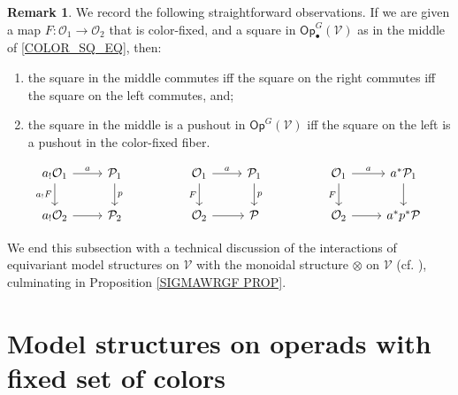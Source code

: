\documentclass[a4paper,10pt
,draft
]{article}%
\numberwithin{equation}{section}
\numberwithin{figure}{section}
\theoremstyle{definition} %
\newtheorem{remark}[equation]{Remark}%
\newcommand{\Op}{\mathsf{Op}}%
\newcommand{\V}{\ensuremath{\mathcal V}}
\renewcommand{\O}{\ensuremath{\mathcal O}}
\renewcommand{\P}{\ensuremath{\mathcal P}}
\newcommand{\1}{\ensuremath{\mathbbm 1}}%
\begin{document}
\begin{remark}\label{COLOR_SQ_REM}
      We record the following straightforward observations.
      If we are given a map $F: \O_1 \to \O_2$ that is color-fixed,
      and a square in $\Op^G_\bullet(\V)$ as in the middle of \eqref{COLOR_SQ_EQ}, then:
      \begin{enumerate}[label = (\roman*)]
      \item the square in the middle commutes iff the square on the right commutes iff the square on the left commutes, and;
      \item the square in the middle is a pushout in $\Op^G(\V)$ iff
            the square on the left is a pushout in the color-fixed fiber. %
      \end{enumerate}
      \begin{equation}
            \label{COLOR_SQ_EQ}
            \begin{tikzcd}
                  a_! \O_1 \arrow[d, "a_! F"'] \arrow[r, "a"]
                  &
                  \P_1 \arrow[d, "p"]
                  &&
                  \O_1 \arrow[d, "F"'] \arrow[r, "a"]
                  &
                  \P_1 \arrow[d, "p"]
                  &&
                  \O_1 \arrow[d, "F"'] \arrow[r, "a"]
                  &
                  a^{\**} \P_1 \arrow[d]
                  \\
                  a_! \O_2 \arrow[r]
                  &
                  \P_2
                  &&
                  \O_2 \arrow[r]
                  &
                  \P
                  &&
                  \O_2 \arrow[r]
                  &
                  a^{\**} p^{\**} \P
            \end{tikzcd}
      \end{equation}
\end{remark}




We end this subsection with a technical discussion of the interactions of equivariant model structures on 
$\mathcal{V}$ with the monoidal structure $\otimes$ on $\mathcal{V}$ (cf. \cite[\S 6.2]{BP_geo}),
culminating in Proposition \ref{SIGMAWRGF PROP}.






\section{Model structures on operads with fixed set of colors}\label{FIXCOL SEC}
\end{document}
